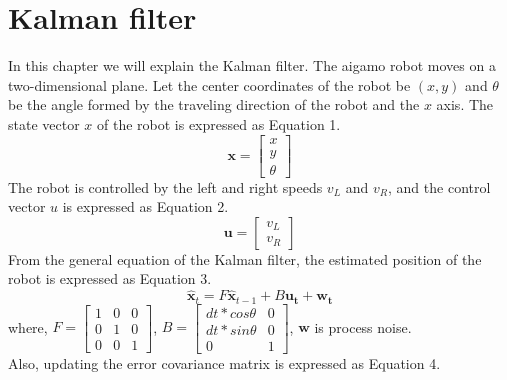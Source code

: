 \documentclass[a4paper]{article}
\begin{document}
\section{Kalman filter}
In this chapter we will explain the Kalman filter. The aigamo robot moves on a two-dimensional plane. Let the center coordinates of the robot be $(x,y)$ and $\theta$ be the angle formed by the traveling direction of the robot and the $x$ axis. The state vector $x$ of the robot is expressed as Equation 1.
\begin{equation}
    \bm{x} = \begin{bmatrix}
        x \\
        y \\
        \theta
        \end{bmatrix} 
\end{equation}
The robot is controlled by the left and right speeds $v_{L}$ and $v_{R}$, and the control vector $u$ is expressed as Equation 2. 
\begin{equation}
    \bm{u} = \begin{bmatrix}
        v_{L} \\
        v_{R} 
        \end{bmatrix} 
\end{equation}
From the general equation of the Kalman filter, the estimated position of the robot is expressed as Equation 3.
\begin{equation}
    \bm{\hat{x}}_{t} =F\bm{\hat{x}}_{t-1} + B\bm{u_{t}} + \bm{w_{t}}
\end{equation}
where, $F = \begin{bmatrix} 1 & 0 & 0 \\  0 & 1 & 0 \\  0 & 0 & 1 \end{bmatrix}$,
$B = \begin{bmatrix} dt * cos\theta & 0 \\  dt * sin\theta & 0 \\ 0 & 1 \end{bmatrix}$, 
$\bm{w}$ is process noise.\\
Also, updating the error covariance matrix is ​​expressed as Equation 4.
\end{document}
